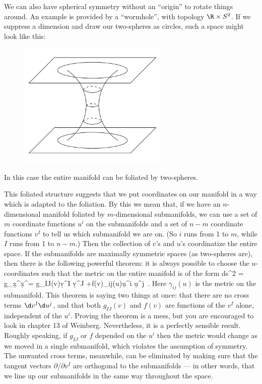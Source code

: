 \documentclass[12pt]{article}
\begin{document}
We can also have spherical symmetry without an ``origin'' to rotate
things around.  An example is provided by a ``wormhole'', with topology
$\R\times S^2$.  If we suppress a dimension and draw our two-spheres
as circles, such a space might look like this:

\eject

\begin{figure}[h]
  \centerline{
  \includegraphics[height=6cm]{pdf/seven2}}
\end{figure}

\noindent In this case the entire manifold can be foliated by two-spheres.

This foliated structure suggests that we put coordinates on our manifold
in a way which is adapted to the foliation.  By this we mean that, if
we have an $n$-dimensional manifold foliated by $m$-dimensional 
submanifolds, we can use a set of $m$ coordinate functions $u^i$ on
the submanifolds and a set of $n-m$ coordinate functions $v^I$ to tell
us which submanifold we are on.  (So $i$ runs from 1 to $m$, while
$I$ runs from 1 to $n-m$.)  Then the collection of $v$'s and $u$'s 
coordinatize the entire space.  If the submanifolds are maximally
symmetric spaces (as two-spheres are), then there is the following
powerful theorem: it is always possible to choose the $u$-coordinates
such that the metric on the entire manifold is of the form
\be
  ds^2 = g_\mn \d x^\mu \d x^\nu = g_{IJ}(v)\d v^I \d v^J
  +f(v)\gamma_{ij}(u)\d u^i \d u^j\ .\label{7.2}
\ee
Here $\gamma_{ij}(u)$ is the metric on the submanifold.
This theorem is saying two things at once: that there are no cross
terms $\d v^I \d u^j$, and that both $g_{IJ}(v)$ and $f(v)$ are functions
of the $v^I$ alone, independent of the $u^i$.  Proving the theorem is
a mess, but you are encouraged to look in chapter 13 of Weinberg.
Nevertheless, it is a perfectly sensible result.  Roughly speaking,
if $g_{IJ}$ or $f$ depended on the $u^i$ then the metric would change
as we moved in a single submanifold, which violates the assumption of
symmetry.  The unwanted cross terms, meanwhile, can be eliminated by
making sure that the tangent vectors $\partial/\partial v^I$ are
orthogonal to the submanifolds --- in other words, that 
we line up our submanifolds in the same way throughout the space.
\end{document}
